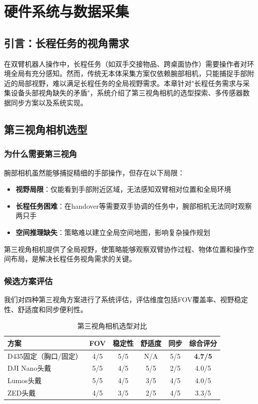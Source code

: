 \section{硬件系统与数据采集}

\subsection{引言：长程任务的视角需求}

在双臂机器人操作中，长程任务（如双手交接物品、跨桌面协作）需要操作者对环境全局有充分感知。然而，传统无本体采集方案仅依赖腕部相机，只能捕捉手部附近的局部视野，难以满足长程任务的全局视野需求。本章针对"长程任务需求与采集设备头部视角缺失的矛盾"，系统介绍了第三视角相机的选型探索、多传感器数据同步方案以及系统实现。

\subsection{第三视角相机选型}

\subsubsection{为什么需要第三视角}

腕部相机虽然能够捕捉精细的手部操作，但存在以下局限：

\begin{itemize}[leftmargin=2em]
    \item \textbf{视野局限}：仅能看到手部附近区域，无法感知双臂相对位置和全局环境
    \item \textbf{长程任务困难}：在handover等需要双手协调的任务中，腕部相机无法同时观察两只手
    \item \textbf{空间推理缺失}：策略难以建立全局空间地图，影响复杂操作规划
\end{itemize}

第三视角相机提供了全局视野，使策略能够观察双臂协作过程、物体位置和操作空间布局，是解决长程任务视角需求的关键。

\subsubsection{候选方案评估}

我们对四种第三视角方案进行了系统评估，评估维度包括FOV覆盖率、视野稳定性、舒适度和同步便利性。

\begin{table}[htbp]
\centering
\caption{第三视角相机选型对比}
\label{tab:camera_comparison}
\begin{tabular}{lccccc}
\toprule
方案 & FOV & 稳定性 & 舒适度 & 同步 & 综合评分 \\
\midrule
D435固定（胸口/固定） & 4/5 & 5/5 & N/A & 5/5 & \textbf{4.7/5} \\
DJI Nano头戴 & 5/5 & 4/5 & 5/5 & 2/5 & 4.0/5 \\
Lumos头戴 & 5/5 & 4/5 & 3/5 & 4/5 & 4.0/5 \\
ZED头戴 & 4/5 & 3/5 & 2/5 & 4/5 & 3.3/5 \\
\bottomrule
\end{tabular}
\end{table}

